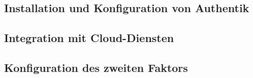 \subsection{Installation und Konfiguration von Authentik}
\label{sec:Installation und Konfiguration von Authentik}


\subsection{Integration mit Cloud-Diensten}
\label{sec:Integration mit Cloud-Diensten}

\subsection{Konfiguration des zweiten Faktors}
\label{sec:Konfiguration des zweiten Faktors}